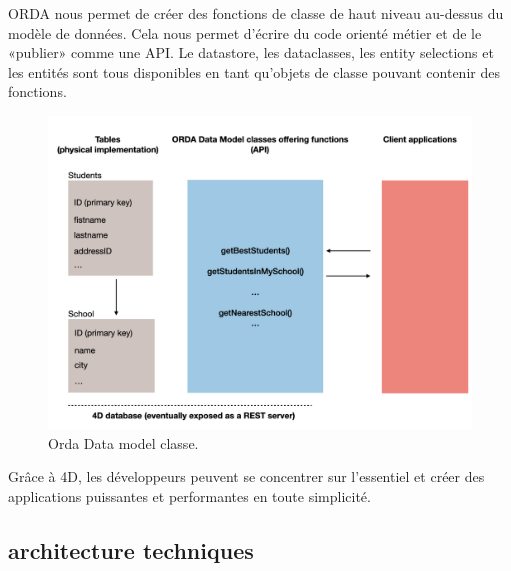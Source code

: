 ORDA nous permet de créer des fonctions de classe de haut niveau au-dessus du modèle de données. Cela nous permet d'écrire du code orienté métier et de le «publier» comme une API. Le datastore, les dataclasses, les entity selections et les entités sont tous disponibles en tant qu'objets de classe pouvant contenir des fonctions.

\begin{figure}[H]
    \centering
    \includegraphics[width=15cm]{Figures/orda.png}
    \caption{Orda Data model classe.}
\end{figure}

Grâce à 4D, les développeurs peuvent se concentrer sur l’essentiel et créer des applications puissantes et performantes en toute simplicité.

\subsection{architecture techniques}


